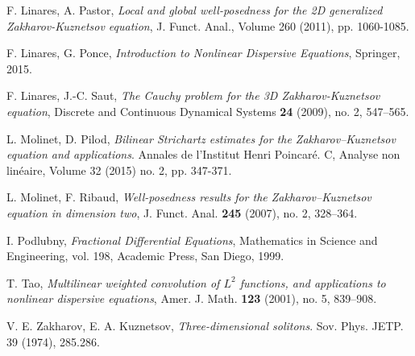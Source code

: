 \documentclass[11pt]{article}
\numberwithin{equation}{section}
\begin{document}
\begin{enumerate}
 F. Linares, A. Pastor, \textit{Local and global well-posedness for the 2D generalized Zakharov-Kuznetsov equation}, J. Funct. Anal., Volume 260 (2011), pp. 1060-1085.

 F. Linares, G. Ponce, \textit{Introduction to Nonlinear Dispersive Equations}, Springer, 2015.

 F. Linares, J.-C. Saut, \textit{The Cauchy problem for the 3D Zakharov-Kuznetsov equation}, Discrete and Continuous Dynamical Systems \textbf{24} (2009), no. 2, 547–565.

 L. Molinet, D. Pilod, \textit{Bilinear Strichartz estimates for the Zakharov–Kuznetsov equation and applications}. Annales de l'Institut Henri Poincaré. C, Analyse non linéaire, Volume 32 (2015) no. 2, pp. 347-371.

 L. Molinet, F. Ribaud, \textit{Well-posedness results
for the Zakharov--Kuznetsov equation in dimension two}, J. Funct.
Anal. \textbf{245} (2007), no. 2, 328--364.

 I. Podlubny, \textit{Fractional Differential Equations}, Mathematics in Science and Engineering, vol. 198, Academic Press, San Diego, 1999.





 T. Tao, \textit{Multilinear weighted convolution of $L^2$ functions, and applications to nonlinear dispersive equations}, Amer. J. Math. \textbf{123} (2001), no. 5, 839--908.

 V. E. Zakharov, E. A. Kuznetsov, \textit{Three-dimensional solitons}. Sov. Phys. JETP. 39 (1974), 285.286.

\end{enumerate}
\end{document}
